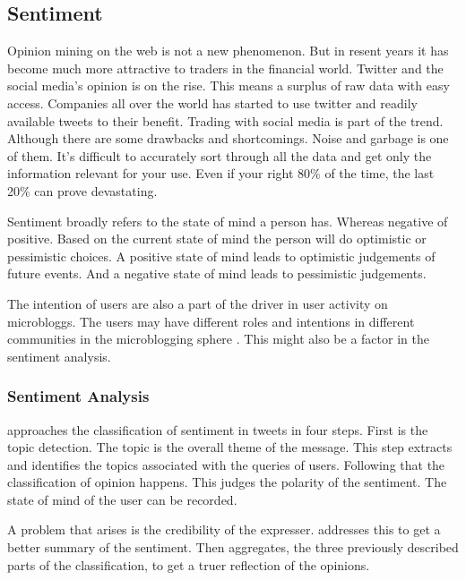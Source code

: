 \subsection{Sentiment}

Opinion mining on the web is not a new phenomenon. But in resent years it has
become much more attractive to traders in the financial world. Twitter and the
social media's opinion is on the rise. This means a surplus of raw data with
easy access. Companies all over the world has started to use twitter and
readily available tweets to their benefit. Trading with social media is part of
the trend. Although there are some drawbacks and shortcomings. Noise and
garbage is one of them. It's difficult to accurately sort through all the data
and get only the information relevant for your use. Even if your right 80\% of
the time, the last 20\% can prove devastating.
\cite[]{stevenson12:social_media_stock_pickers}

Sentiment broadly refers to the state of mind a person has. Whereas negative of
positive. Based on the current state of mind the person will do optimistic or
pessimistic choices. A positive state of mind leads to optimistic judgements of
future events. And a negative state of mind leads to pessimistic judgements.
\cite[p4]{doukas10:sentiment_and_momentum}

The intention of users are also a part of the driver in user activity on
microbloggs. The users may have different roles and intentions in different
communities in the microblogging sphere \cite[]{java07}. This might also be a
factor in the sentiment analysis.

\subsubsection{Sentiment Analysis}
\cite[]{Li2013206} approaches the classification of sentiment in tweets in four
steps. First is the topic detection. The topic is the overall theme of the
message. This step extracts and identifies the topics associated with the
queries of users. Following that the classification of opinion happens. This
judges the polarity of the sentiment. The state of mind of the user can be
recorded.

A problem that arises is the credibility of the expresser. \cite[]{Li2013206} addresses this to
get a better summary of the sentiment. Then aggregates, the
three previously described parts of the classification, to get a truer
reflection of the opinions.

